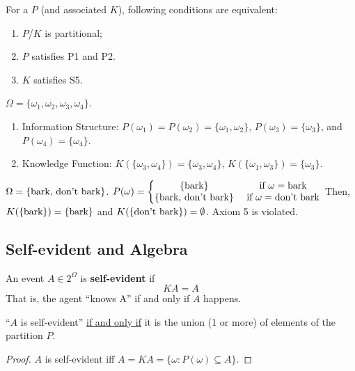 \documentclass[11pt]{elegantbook}
\begin{document}
\begin{theorem}
    For a $P$ (and associated $K$), following conditions are equivalent:
    \begin{enumerate}[$\circ$]
        \item $P$/$K$ is partitional;
        \item $P$ satisfies P1 and P2.
        \item $K$ satisfies S5.
    \end{enumerate}
\end{theorem}

\begin{example}[ (Partitional)]
    $\Omega=\{\omega_1,\omega_2,\omega_3,\omega_4\}$.
    \begin{enumerate}
        \item Information Structure: $P(\omega_1)=P(\omega_2)=\{\omega_1,\omega_2\}$, $P(\omega_3)=\{\omega_3\}$, and $P(\omega_4)=\{\omega_4\}$.
        \item Knowledge Function: $K(\{\omega_3,\omega_4\})=\{\omega_3,\omega_4\}$, $K(\{\omega_1,\omega_3\})=\{\omega_3\}$.
    \end{enumerate}
\end{example}

\begin{example}
    $\Omega=\{\textnormal{bark, don't bark}\}$. $P(\omega)=\left\{\begin{matrix}
        \{\textnormal{bark}\} & \textnormal{ if }\omega=\textnormal{bark}\\
        \{\textnormal{bark, don't bark}\}& \textnormal{ if }\omega=\textnormal{don't bark}
    \end{matrix}\right.$ Then, $K(\{\textnormal{bark}\})=\{\textnormal{bark}\}$ and $K(\{\textnormal{don't bark}\})=\emptyset$.  Axiom 5 is violated.
\end{example}

\subsection{Self-evident and Algebra}
\begin{definition}
    \normalfont
    An event $A \in 2^\Omega$ is \textbf{self-evident} if $$KA = A$$ That is, the agent ``knows A'' if and only if $A$ happens.
\end{definition}

\begin{proposition}
    ``$A$ is self-evident'' \underline{if and only if} it is the union (1 or more) of elements of the partition $P$.
\end{proposition}
\begin{proof}
    $A$ is self-evident iff $A=KA=\{\omega:P(\omega)\subseteq A\}$.
\end{proof}
\end{document}
